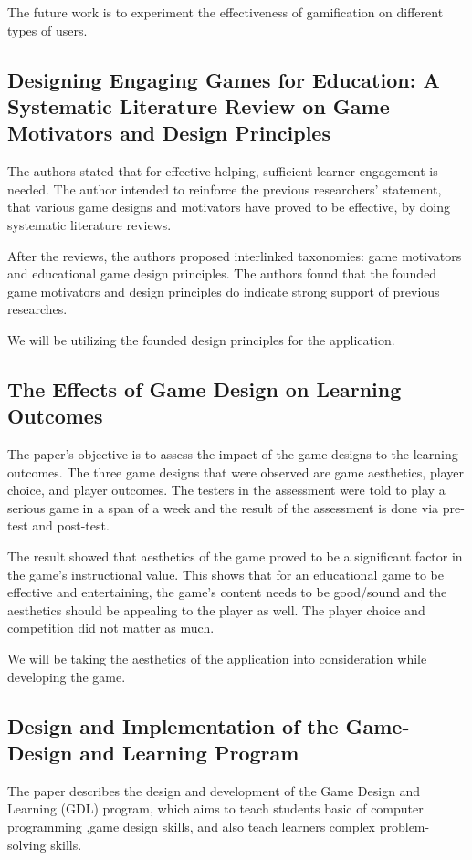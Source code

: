 The future work is to experiment the effectiveness of gamification on different types of users.

\subsection{Designing Engaging Games for Education: A Systematic Literature Review on Game Motivators and Design Principles \cite{Design}}
The authors stated that for effective helping, sufficient learner engagement is needed. The author intended to reinforce the previous researchers' statement, that various game designs and motivators have proved to be effective, by doing systematic literature reviews.

After the reviews, the authors proposed interlinked taxonomies: game motivators and educational game design principles. The authors found that the founded game motivators and design principles do indicate strong support of previous researches.

We will be utilizing the founded design principles for the application.

\subsection{The Effects of Game Design on Learning Outcomes \cite{Effect}}
The paper’s objective is to assess the impact of the game designs to the learning outcomes. The three game designs that were observed are game aesthetics, player choice, and player outcomes. The testers in the assessment were told to play a serious game in a span of a week and the result of the assessment is done via pre-test and post-test.

The result showed that aesthetics of the game proved to be a significant factor in the game’s instructional value. This shows that for an educational game to be effective and entertaining, the game’s content needs to be good/sound and the aesthetics should be appealing to the player as well. The player choice and competition did not matter as much.

We will be taking the aesthetics of the application into consideration while developing the game.

\subsection{Design and Implementation of the Game-Design and Learning Program \cite{Implement}}
The paper describes the design and development of the Game Design and Learning (GDL) program, which aims to teach students basic of computer programming ,game design skills, and also teach learners complex problem-solving skills.

